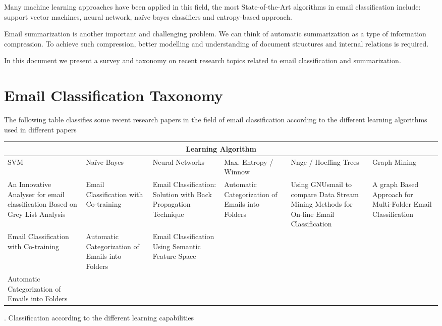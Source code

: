 \documentclass[12pt]{article}
\begin{document}
Many machine learning approaches have been applied in this field, the most 
State-of-the-Art algorithms in email classification include: support vector 
machines, neural network, naïve bayes classifiers and entropy-based approach. 

Email summarization is another important and challenging problem. We can think 
of automatic summarization as a type of information compression. To achieve such 
compression, better modelling and understanding of document structures and internal 
relations is required. 

In this document we present a survey and taxonomy on recent research topics 
related to email classification and summarization.

\section{Email Classification Taxonomy}
The following table classifies some recent research papers in the field of email 
classification according to the different learning algorithms used in different papers

\begin{center}
\begin{tabular}{|p{2cm}|p{2cm}|p{2cm}|p{2cm}|p{2cm}|p{2cm}|}
\hline
\multicolumn{6}{|c|}{Learning Algorithm} \\
\hline
SVM & Naïve Bayes & Neural Networks & Max. Entropy / Winnow & Nnge / Hoeffing Trees & Graph Mining \\ \hline
An Innovative Analyser for email classification Based on Grey List Analysis &
Email Classification with Co-training &
Email Classification: Solution with Back Propagation Technique & 
Automatic Categorization of Emails into Folders &
Using GNUsmail to compare Data Stream Mining Methods for On-line Email Classification &
A graph Based Approach for Multi-Folder Email Classification \\ \hline

Email Classification with Co-training &
Automatic Categorization of Emails into Folders &
Email Classification Using Semantic Feature Space & 
&
&
 \\ \hline

Automatic Categorization of Emails into Folders &
&
& 
&
&

 \\
\hline
\end{tabular}
\end{center}
 
.
\newpage
Classification according to the different learning capabilities
\\
\end{document}

